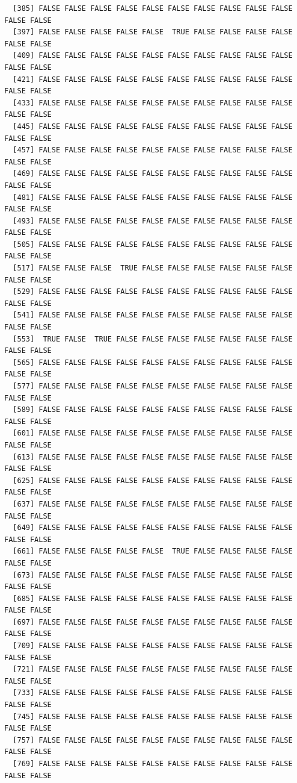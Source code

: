 \documentclass[
  a4paper,
  DIV=11,
  numbers=noendperiod]{scrartcl}
\begin{document}
\begin{verbatim}
  [385] FALSE FALSE FALSE FALSE FALSE FALSE FALSE FALSE FALSE FALSE FALSE FALSE
  [397] FALSE FALSE FALSE FALSE FALSE  TRUE FALSE FALSE FALSE FALSE FALSE FALSE
  [409] FALSE FALSE FALSE FALSE FALSE FALSE FALSE FALSE FALSE FALSE FALSE FALSE
  [421] FALSE FALSE FALSE FALSE FALSE FALSE FALSE FALSE FALSE FALSE FALSE FALSE
  [433] FALSE FALSE FALSE FALSE FALSE FALSE FALSE FALSE FALSE FALSE FALSE FALSE
  [445] FALSE FALSE FALSE FALSE FALSE FALSE FALSE FALSE FALSE FALSE FALSE FALSE
  [457] FALSE FALSE FALSE FALSE FALSE FALSE FALSE FALSE FALSE FALSE FALSE FALSE
  [469] FALSE FALSE FALSE FALSE FALSE FALSE FALSE FALSE FALSE FALSE FALSE FALSE
  [481] FALSE FALSE FALSE FALSE FALSE FALSE FALSE FALSE FALSE FALSE FALSE FALSE
  [493] FALSE FALSE FALSE FALSE FALSE FALSE FALSE FALSE FALSE FALSE FALSE FALSE
  [505] FALSE FALSE FALSE FALSE FALSE FALSE FALSE FALSE FALSE FALSE FALSE FALSE
  [517] FALSE FALSE FALSE  TRUE FALSE FALSE FALSE FALSE FALSE FALSE FALSE FALSE
  [529] FALSE FALSE FALSE FALSE FALSE FALSE FALSE FALSE FALSE FALSE FALSE FALSE
  [541] FALSE FALSE FALSE FALSE FALSE FALSE FALSE FALSE FALSE FALSE FALSE FALSE
  [553]  TRUE FALSE  TRUE FALSE FALSE FALSE FALSE FALSE FALSE FALSE FALSE FALSE
  [565] FALSE FALSE FALSE FALSE FALSE FALSE FALSE FALSE FALSE FALSE FALSE FALSE
  [577] FALSE FALSE FALSE FALSE FALSE FALSE FALSE FALSE FALSE FALSE FALSE FALSE
  [589] FALSE FALSE FALSE FALSE FALSE FALSE FALSE FALSE FALSE FALSE FALSE FALSE
  [601] FALSE FALSE FALSE FALSE FALSE FALSE FALSE FALSE FALSE FALSE FALSE FALSE
  [613] FALSE FALSE FALSE FALSE FALSE FALSE FALSE FALSE FALSE FALSE FALSE FALSE
  [625] FALSE FALSE FALSE FALSE FALSE FALSE FALSE FALSE FALSE FALSE FALSE FALSE
  [637] FALSE FALSE FALSE FALSE FALSE FALSE FALSE FALSE FALSE FALSE FALSE FALSE
  [649] FALSE FALSE FALSE FALSE FALSE FALSE FALSE FALSE FALSE FALSE FALSE FALSE
  [661] FALSE FALSE FALSE FALSE FALSE  TRUE FALSE FALSE FALSE FALSE FALSE FALSE
  [673] FALSE FALSE FALSE FALSE FALSE FALSE FALSE FALSE FALSE FALSE FALSE FALSE
  [685] FALSE FALSE FALSE FALSE FALSE FALSE FALSE FALSE FALSE FALSE FALSE FALSE
  [697] FALSE FALSE FALSE FALSE FALSE FALSE FALSE FALSE FALSE FALSE FALSE FALSE
  [709] FALSE FALSE FALSE FALSE FALSE FALSE FALSE FALSE FALSE FALSE FALSE FALSE
  [721] FALSE FALSE FALSE FALSE FALSE FALSE FALSE FALSE FALSE FALSE FALSE FALSE
  [733] FALSE FALSE FALSE FALSE FALSE FALSE FALSE FALSE FALSE FALSE FALSE FALSE
  [745] FALSE FALSE FALSE FALSE FALSE FALSE FALSE FALSE FALSE FALSE FALSE FALSE
  [757] FALSE FALSE FALSE FALSE FALSE FALSE FALSE FALSE FALSE FALSE FALSE FALSE
  [769] FALSE FALSE FALSE FALSE FALSE FALSE FALSE FALSE FALSE FALSE FALSE FALSE

\end{verbatim}
\end{document}
